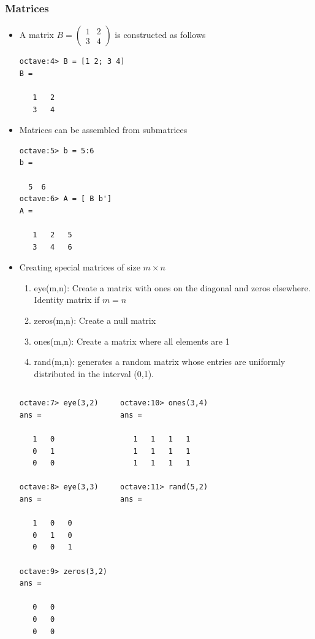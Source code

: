 \documentclass[slidestop,mathserif,compress,xcolor=svgnames]{beamer}
\begin{document}
\begin{frame}
  \frametitle{\small Matrices}
  \begin{itemize}
    \item A matrix $B=\left(\begin{array}{cc}1 & 2 \\ 3 & 4 \end{array}\right)$ is constructed as follows
    \begin{verbatim}
octave:4> B = [1 2; 3 4]
B =

   1   2
   3   4
    \end{verbatim}
    \item Matrices can be assembled from submatrices
    \begin{verbatim}
octave:5> b = 5:6
b =

  5  6
octave:6> A = [ B b']
A =

   1   2   5
   3   4   6
    \end{verbatim}
    \framebreak
    \item Creating special matrices of size $m\times n$
    \begin{enumerate}
      \item eye(m,n): Create a matrix with ones on the diagonal and zeros elsewhere. Identity matrix if $m=n$
      \item zeros(m,n): Create a null matrix
      \item ones(m,n): Create a matrix where all elements are 1
      \item rand(m,n): generates a random matrix whose entries are uniformly distributed in the interval (0,1).
    \end{enumerate}
    {\tiny
    \begin{columns}
      \column{4cm}
      \begin{verbatim}
octave:7> eye(3,2)
ans =

   1   0
   0   1
   0   0

octave:8> eye(3,3)
ans =

   1   0   0
   0   1   0
   0   0   1

octave:9> zeros(3,2)
ans =

   0   0
   0   0
   0   0
      \end{verbatim}
      \column{4cm}
      \begin{verbatim}
octave:10> ones(3,4)
ans =

   1   1   1   1
   1   1   1   1
   1   1   1   1

octave:11> rand(5,2)
ans =


\end{verbatim}
\end{columns}}
\end{itemize}
\end{frame}
\end{document}
